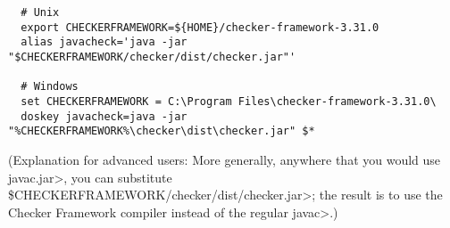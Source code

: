 \begin{itemize}
\begin{Verbatim}
  # Unix
  export CHECKERFRAMEWORK=${HOME}/checker-framework-3.31.0
  alias javacheck='java -jar "$CHECKERFRAMEWORK/checker/dist/checker.jar"'

  # Windows
  set CHECKERFRAMEWORK = C:\Program Files\checker-framework-3.31.0\
  doskey javacheck=java -jar "%CHECKERFRAMEWORK%\checker\dist\checker.jar" $*
\end{Verbatim}

  (Explanation for advanced users:
  More generally, anywhere that you would use \<javac.jar>, you can substitute
  \<\$CHECKERFRAMEWORK/checker/dist/checker.jar>;
  the result is to use the Checker
  Framework compiler instead of the regular \<javac>.)

\end{itemize}



%
%
%
%
%
%
%
%
%


